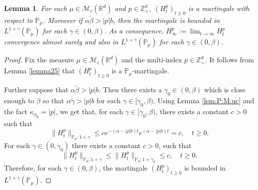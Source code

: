 \documentclass[12pt,a4paper]{amsart}
\theoremstyle{plain}
\newtheorem{lem}[thm]{Lemma}
\theoremstyle{definition}
\numberwithin{equation}{section}
\begin{document}
\begin{lem}
  \label{lem:M:L:ML}
  For each $\mu\in \mathcal M_c(\mathbb R^d)$ and $p \in \mathbb Z_+^d$, $(H^p_t)_{t\geq 0}$ is a martingale with respect to $\mathbb P_\mu$. 
  Moreover if $\alpha\tilde \beta>|p|b$, then the martingale is bounded in $L^{1+\gamma}(\mathbb P_\mu)$ for each $\gamma\in (0, \beta)$. 
  As a consequence, $ H_{\infty}^p := \lim_{t\rightarrow \infty}H_t^p $ convergence almost surely and also in $L^{1+\gamma}(\mathbb{P}_{\mu})$ for each $\gamma \in (0,\beta)$.
\end{lem}
\begin{proof}
  Fix the measure $\mu \in \mathcal M_c(\mathbb R^d)$ and the multi-index $p \in \mathbb Z_+^d$.
  It follows from Lemma \ref{lemma25} that $(H_t^p)_{t\geq 0}$ is a $\mathbb P_\mu$-martingale.
  
  Further suppose that $\alpha \tilde \beta > |p| b$.
  Then there exists a $\gamma_0 \in (0,\beta)$ which is close enough to $\beta$ so that $\alpha\tilde \gamma>|p|b$ for each $\gamma\in [\gamma_0, \beta)$.
  Using  Lemma \ref{lem:P:M:uc} and the fact $\kappa_{\phi_p}=|p|$, we get that, for each $\gamma\in [\gamma_0, \beta)$, there exists a constant $c>0$ such that
\[
 	\|H_t^p\|_{\mathbb P_\mu;1+\gamma}
  \leq c e^{-(\alpha-|p|b)t}e^{(\alpha-|p|b)t}
  = c
  , \quad t\geq 0.
\]
For each $\gamma\in (0, \gamma_0)$ there exists a constant $c>0$, such that
\[
	\| H_t^p \|_{\mathbb P_\mu;1+\gamma}
	\leq \| H_t^p \|_{\mathbb P_\mu;1+\gamma_0}
  \leq c,
	\quad t\geq 0.
\]
Therefore, for each $\gamma \in (0,\beta)$, the martingale $(H_t^p)_{t\geq 0}$ is bounded in $L^{1+\gamma}(\mathbb{P}_{\mu})$.
\end{proof}
\end{document}
